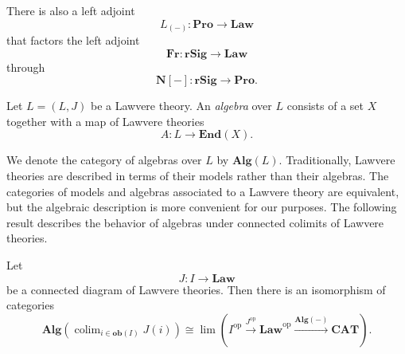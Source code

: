 \documentclass{tac}
\begin{document}
There is also a left adjoint
\[
L_{(-)}:\mathbf{Pro}\to\mathbf{Law}
\]
that factors the left adjoint
\[
\mathbf{Fr}:\mathbf{rSig}\to\mathbf{Law}
\]
through
\[
\mathbf{N}[-]:\mathbf{rSig}\to\mathbf{Pro}.
\]

\begin{definition}
Let $L=(L,J)$ be a Lawvere theory. An \emph{algebra} over $L$ consists of a set $X$ together with a map of Lawvere theories
\[
A:L\to\mathbf{End}(X).
\]
\end{definition}

We denote the category of algebras over $L$ by $\mathbf{Alg}(L)$. Traditionally, Lawvere theories are described in terms of their models rather than their algebras. The categories of models and algebras associated to a Lawvere theory are equivalent, but the algebraic description is more convenient for our purposes. The following result describes the behavior of algebras under connected colimits of Lawvere theories.

\begin{theorem}\label{Alg_pre_conn_colimits}
Let
\[
J:I\to\mathbf{Law}
\]
be a connected diagram of Lawvere theories. Then there is an isomorphism of categories
\[
\mathbf{Alg}\left(\operatorname{colim}_{i\in\mathbf{ob}(I)}J(i)\right)
\cong
\lim
\left(
I^{\mathrm{op}}
\xrightarrow{J^{\mathrm{op}}}
\mathbf{Law}^{\mathrm{op}}
\xrightarrow{\mathbf{Alg}(-)}
\mathbf{CAT}
\right).
\]
\end{theorem}
\end{document}
